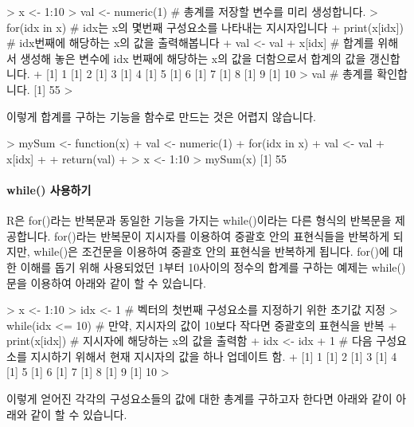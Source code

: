 \documentclass{book}
\begin{document}
\begin{Schunk}
\begin{Soutput}
> x <- 1:10
> val <- numeric(1)    # 총계를 저장할 변수를 미리 생성합니다.
> for(idx in x){       # idx는 x의 몇번째 구성요소를 나타내는 지시자입니다
+ print(x[idx])        # idx번째에 해당하는 x의 값을 출력해봅니다 
+ val <- val + x[idx]  # 합계를 위해서 생성해 놓은 변수에 idx 번째에 해당하는 x의 값을 더함으로서 합계의 값을 갱신합니다.
+ }
[1] 1
[1] 2
[1] 3
[1] 4
[1] 5
[1] 6
[1] 7
[1] 8
[1] 9
[1] 10
> val                   # 총계를 확인합니다. 
[1] 55
> 
\end{Soutput}
\end{Schunk}

이렇게 합계를 구하는 기능을 함수로 만드는 것은 어렵지 않습니다.

\begin{Schunk}
\begin{Soutput}
> mySum <- function(x){
+ val <- numeric(1)
+ for(idx in x){
+ val <- val + x[idx]
+ }
+ return(val)
+ }
> x <- 1:10
> mySum(x)
[1] 55
\end{Soutput}
\end{Schunk}

\paragraph{while() 사용하기}
R은 for()라는 반복문과 동일한 기능을 가지는 while()이라는 다른 형식의 반복문을 제공합니다.
for()라는 반복문이 지시자를 이용하여 중괄호 안의 표현식들을 반복하게 되지만, while()은 조건문을 이용하여 중괄호 안의 표현식을 반복하게 됩니다. 
for()에 대한 이해를 돕기 위해 사용되었던 1부터 10사이의 정수의 합계를 구하는 예제는 while()문을 이용하여 아래와 같이 할 수 있습니다.

\begin{Schunk}
\begin{Soutput}
> x <- 1:10
> idx <- 1              # 벡터의 첫번째 구성요소를 지정하기 위한 초기값 지정 
> while(idx <= 10){     # 만약, 지시자의 값이 10보다 작다면 중괄호의 표현식을 반복 
+ print(x[idx])         # 지시자에 해당하는 x의 값을 출력함 
+ idx <- idx + 1        # 다음 구성요소를 지시하기 위해서 현재 지시자의 값을 하나 업데이트 함.
+ }
[1] 1
[1] 2
[1] 3
[1] 4
[1] 5
[1] 6
[1] 7
[1] 8
[1] 9
[1] 10
> 
\end{Soutput}
\end{Schunk}

이렇게 얻어진 각각의 구성요소들의 값에 대한 총계를 구하고자 한다면 아래와 같이 아래와 같이 할 수 있습니다.
\end{document}
